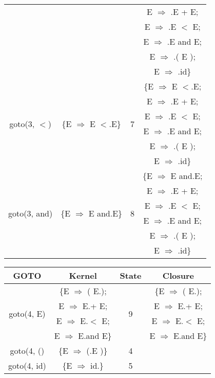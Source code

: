 \begin{table}[!ht]
\begin{minipage}[t]{.4\linewidth}
\begin{tabular}{|c|c|c|c|}
      & & & E $\Rightarrow$ .E + E; \\
      & & & E $\Rightarrow$ .E $<$ E; \\
      & & & E $\Rightarrow$ .E and E; \\
      & & & E $\Rightarrow$ .( E ); \\
      & & & E $\Rightarrow$ .id\}\\
      \hline
      \multirow{6}{*}{goto(3, $<$)} & \multirow{6}{*}{\{E $\Rightarrow$ E $<$.E\}}	& \multirow{6}{*}{7}	& \{E $\Rightarrow$ E $<$.E; \\
      & & & E $\Rightarrow$ .E + E; \\
      & & & E $\Rightarrow$ .E $<$ E; \\
      & & & E $\Rightarrow$ .E and E; \\
      & & & E $\Rightarrow$ .( E ); \\
      & & & E $\Rightarrow$ .id\}\\
      \hline
      \multirow{6}{*}{goto(3, and)} & \multirow{6}{*}{\{E $\Rightarrow$ E and.E\}}	& \multirow{6}{*}{8}	& \{E $\Rightarrow$ E and.E; \\
      & & & E $\Rightarrow$ .E + E; \\
      & & & E $\Rightarrow$ .E $<$ E; \\
      & & & E $\Rightarrow$ .E and E; \\
      & & & E $\Rightarrow$ .( E ); \\
      & & & E $\Rightarrow$ .id\}\\
      \hline
    \end{tabular}
  \end{minipage}
  \hspace{3cm}
  \begin{minipage}[t]{.4\linewidth}
    \begin{tabular}{|c|c|c|c|}
      \hline
      GOTO & Kernel & State & Closure\\
      \hline
      \multirow{4}{*}{goto(4, E)} & \{E $\Rightarrow$ ( E.); & \multirow{4}{*}{9}	& \{E $\Rightarrow$ ( E.); \\
      & E $\Rightarrow$ E.+ E; & & E $\Rightarrow$ E.+ E; \\
      & E $\Rightarrow$ E.$<$ E; & & E $\Rightarrow$ E.$<$ E; \\
      & E $\Rightarrow$ E.and E\} & & E $\Rightarrow$ E.and E\}\\
      \hline
      goto(4, ()	& \{E $\Rightarrow$ (.E )\}	& 4	& \\
      \hline
      goto(4, id)	& \{E $\Rightarrow$ id.\} & 5 & \\

\end{tabular}
\end{minipage}
\end{table}
